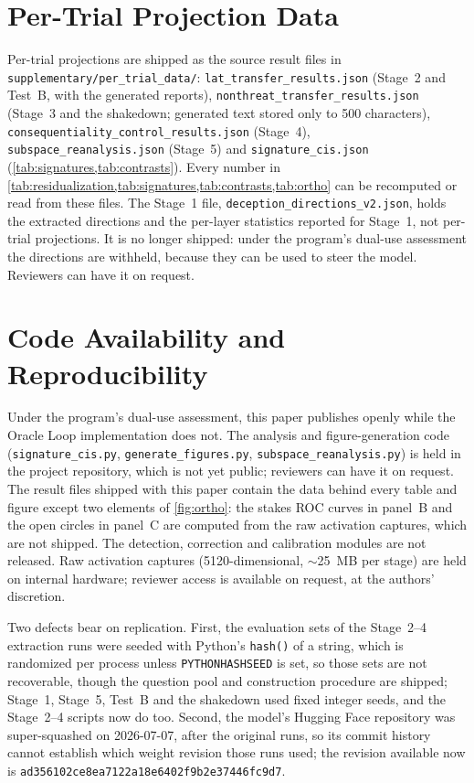 \documentclass[11pt,letterpaper]{article}
\begin{document}
\section{Per-Trial Projection Data}\label{app:data}

\begin{sloppypar}
Per-trial projections are shipped as the source result files in
\texttt{supplementary/per\_trial\_data/}:
\texttt{lat\_transfer\_results.json} (Stage~2 and Test~B, with the generated reports),
\texttt{nonthreat\_transfer\_results.json} (Stage~3 and the shakedown; generated text stored only to
500 characters), \texttt{consequentiality\_control\_results.json} (Stage~4),
\texttt{subspace\_reanalysis.json} (Stage~5) and \texttt{signature\_cis.json}
(\cref{tab:signatures,tab:contrasts}). Every number in \cref{tab:residualization,tab:signatures,tab:contrasts,tab:ortho} can be recomputed or read from these files.
The Stage~1 file, \texttt{deception\_directions\_v2.json}, holds the extracted directions and the
per-layer statistics reported for Stage~1, not per-trial projections. It is no longer shipped: under
the program's dual-use assessment the directions are withheld, because they can be used to steer the
model. Reviewers can have it on request.
\end{sloppypar}

\section{Code Availability and Reproducibility}\label{app:code}

Under the program's dual-use assessment, this paper publishes openly while the Oracle Loop
implementation does not. The analysis and figure-generation code (\nolinkurl{signature_cis.py},
\nolinkurl{generate_figures.py}, \nolinkurl{subspace_reanalysis.py}) is held in the project repository, which
is not yet public; reviewers can have it on request. The result files shipped with this paper contain the
data behind every table and figure except two elements of \cref{fig:ortho}: the stakes ROC curves in
panel~B and the open circles in panel~C are computed from the raw activation captures, which are not
shipped. The detection, correction and calibration modules are not released. Raw
activation captures (5120-dimensional, $\sim$25~MB per stage) are held on internal hardware; reviewer
access is available on request, at the authors' discretion.

Two defects bear on replication. First, the evaluation sets of the Stage~2--4 extraction runs were
seeded with Python's \texttt{hash()} of a string, which is randomized per process unless
\texttt{PYTHONHASHSEED} is set, so those sets are not recoverable, though the question pool and
construction procedure are shipped; Stage~1, Stage~5, Test~B and the shakedown used fixed integer
seeds, and the Stage~2--4 scripts now do too. Second, the model's Hugging Face repository was
super-squashed on 2026-07-07, after the original runs, so its commit history cannot establish which
weight revision those runs used; the revision available now is
\texttt{ad356102ce8ea7122a18e6402f9b2e37446fc9d7}.
\end{document}
